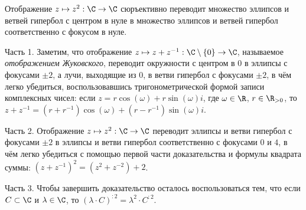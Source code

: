 \documentclass[
	extrafontsizes,
	11pt,
	hyphens,
]{memoir}
\begin{document}

\begin{theorem}
Отображение \(z \mapsto z^2 : \C \to \C\) сюръективно переводит множество эллипсов и ветвей гипербол с центром в нуле в множество эллипсов и ветвей гипербол соответственно с фокусом в нуле.
\end{theorem}

\begin{proofparts}

\item[Часть 1.]
Заметим, что отображение
\(z \mapsto z + z^{-1} : \C \setminus \{0\} \to \C\),
называемое \emph{отображением Жуковского},
переводит окружности с центром в \(0\) в эллипсы с фокусами \(\pm 2\),
а лучи, выходящие из \(0\), в ветви гипербол с фокусами \(\pm 2\),
в чём легко убедиться, воспользовавшись тригонометрической формой записи комплексных чисел:
если
\(z = r \cos(\omega) + r \sin(\omega) i\),
где \(\omega \in \R\), \(r \in \R_{>0}\),
то
\(z + z^{-1} = (r + r^{-1}) \cos(\omega) + (r - r^{-1}) \sin(\omega) i\).

\item[Часть 2.]
Отображение \(z \mapsto z^2 : \C \to \C\) переводит эллипсы и ветви гипербол с фокусами \(\pm 2\) в эллипсы и ветви гипербол соответственно с фокусами \(0\) и \(4\),
в чём легко убедиться с помощью первой части доказательства и формулы квадрата суммы: \((z + z^{-1})^2 = (z^2 + z^{-2}) + 2\).

\item[Часть 3.]
Чтобы завершить доказательство осталось воспользоваться тем, что если \(C \subset \C\) и \(\lambda \in \C\),
то \((\lambda \cdot C)^{:2} = \lambda^2 \cdot C^{:2}\).
\qedhere



\end{proofparts}
\end{document}
